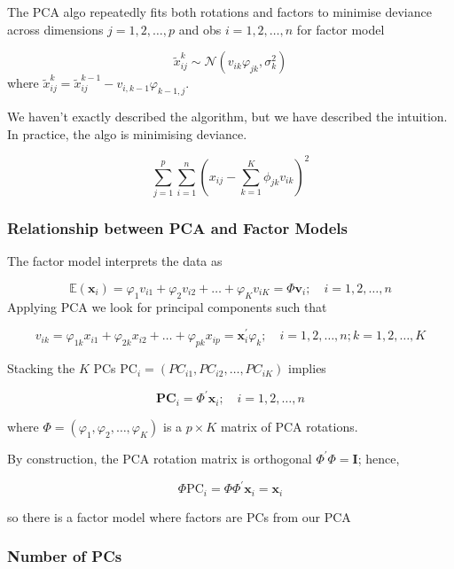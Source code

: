 \documentclass[11pt]{article}
\begin{document}
The PCA algo repeatedly fits both rotations and factors to minimise deviance across dimensions $j=1,2, \ldots, p$ and obs $i=1,2, \ldots, n$ for factor model

$$
\tilde{x}_{i j}^{k} \sim \mathcal{N}\left(v_{i k} \varphi_{j k}, \sigma_{k}^{2}\right)
$$
where $\tilde{x}_{i j}^{k}=\tilde{x}_{i j}^{k-1}-v_{i, k-1} \varphi_{k-1, j}$.

\begin{note}
    We haven't exactly described the algorithm, but we have described the intuition. In practice, the algo is minimising deviance.

$$
\sum_{j=1}^{p} \sum_{i=1}^{n}\left(x_{i j}-\sum_{k=1}^{K} \phi_{j k} v_{i k}\right)^{2}
$$
\end{note}

\subsubsection{Relationship between PCA and Factor Models}

The factor model interprets the data as

$$
\mathbb{E}\left(\mathbf{x}_{i}\right)=\varphi_{1} v_{i 1}+\varphi_{2} v_{i 2}+\ldots+\varphi_{K} v_{i K}=\Phi \mathbf{v}_{i} ; \quad i=1,2, \ldots, n
$$
Applying PCA we look for principal components such that

$$
v_{i k}=\varphi_{1 k} x_{i 1}+\varphi_{2 k} x_{i 2}+\ldots+\varphi_{p k} x_{i p}=\mathbf{x}_{i}^{\prime} \varphi_{k} ; \quad i=1,2, \ldots, n ; k=1,2, \ldots, K
$$

Stacking the $K$ PCs $\mathrm{PC}_{i}=\left(P C_{i 1}, P C_{i 2}, \ldots, P C_{i K}\right)$ implies

$$
\mathbf{P C}_{i}=\Phi^{\prime} \mathbf{x}_{i} ; \quad i=1,2, \ldots, n
$$

where $\Phi=\left(\varphi_{1}, \varphi_{2}, \ldots, \varphi_{K}\right)$ is a $p \times K$ matrix of PCA rotations.

By construction, the PCA rotation matrix is orthogonal $\Phi^{\prime} \Phi=\mathbf{I}$; hence,

$$
\Phi \mathrm{PC}_{i}=\Phi \Phi^{\prime} \mathbf{x}_{i}=\mathbf{x}_{i}
$$

so there is a factor model where factors are PCs from our PCA

\subsubsection{Number of PCs}
\end{document}
